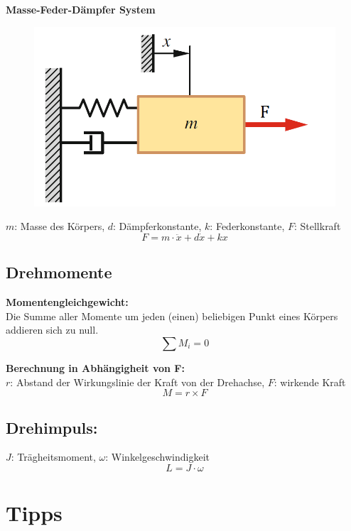 \documentclass[10pt,a4paper]{article}
\begin{document}
\textbf{Masse-Feder-Dämpfer System}
\begin{figure}[H]
	\includegraphics[width=0.5\columnwidth]{imgs/mass-spring-damper.png}
\end{figure}
$m$: Masse des Körpers, $d$: Dämpferkonstante, $k$: Federkonstante, $F$: Stellkraft
$$
	F = m ⋅ \ddot x + d \dot x + k x
$$


\subsection{Drehmomente}
\textbf{Momentengleichgewicht:} \\
Die Summe aller Momente um jeden (einen) beliebigen Punkt eines Körpers addieren sich zu null.
$$
	\sum M_i = 0
$$

\textbf{Berechnung in Abhängigheit von F:} \\
$r$: Abstand der Wirkungslinie der Kraft von der Drehachse, $F$: wirkende Kraft
$$
	M = r \times F
$$

\subsection{Drehimpuls:}
$J$: Trägheitsmoment, $\omega$: Winkelgeschwindigkeit
$$
	L = J ⋅ \omega
$$


\section{Tipps}
\end{document}
